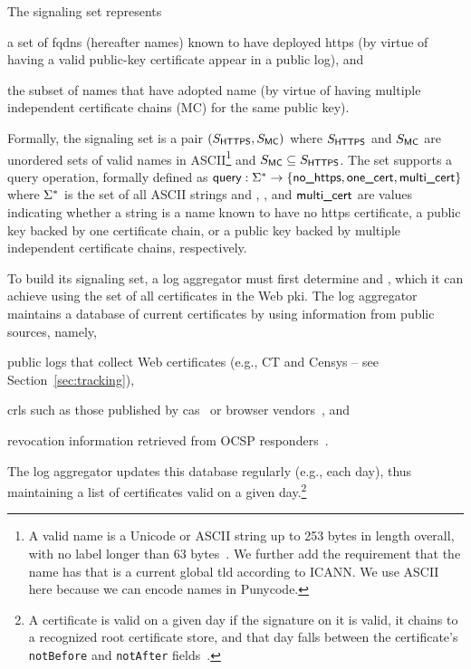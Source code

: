 The signaling set represents
\begin{inparaenum}
\item a set of \acp{fqdn} (hereafter names) known to have deployed \ac{https}
  (by virtue of having a valid public-key certificate appear in a public log), and
\item the subset of names that have adopted \ac{name} (by virtue of having
  multiple independent certificate chains (MC) for the same public key).
\end{inparaenum}
Formally, the signaling set is a pair $(S_{\textsf{HTTPS}}, S_{\textsf{MC}})$ where
$S_{\textsf{HTTPS}}$ and $S_{\textsf{MC}}$ are unordered sets of valid names in
ASCII\footnote{A valid name is a Unicode or ASCII string up to 253 bytes in
  length overall, with no label longer than 63 bytes~\cite{rfc1035}. We further
add the requirement that the name has  that is a current global
\ac{tld} according to ICANN. We use ASCII here because we can encode names in
Punycode.} and $S_{\textsf{MC}} \subseteq S_{\textsf{HTTPS}}$. The set supports a query
operation, formally defined as $\textsf{query}: \Sigma^* \to \{\textsf{no\_https}, \textsf{one\_cert},
\textsf{multi\_cert}\}$ where $\Sigma^*$ is the set of all ASCII strings and \nohttps,
\onecert, and $\textsf{multi\_cert}$ are values indicating whether a string is a name
known to have no \ac{https} certificate, a public key backed by one certificate
chain, or a public key backed by multiple independent certificate chains,
respectively.

To build its signaling set, a log aggregator must first determine \httpsset
and \multicertset, which it can achieve using the set of all certificates in the
Web \ac{pki}. The log aggregator maintains a database of current certificates by
using information from public sources, namely,
\begin{inparaenum}
\item public logs that collect Web certificates 
  (e.g., CT and Censys -- see Section~\ref{sec:tracking}),
\item \acp{crl} such as those published by \acp{ca}~\cite{rfc5280} or browser
  vendors~\cite{langley2012revocation, goodwin2015revoking}, and
\item revocation information retrieved from OCSP responders~\cite{rfc6960}.
\end{inparaenum}
The log aggregator updates this database regularly (e.g., each day), thus
maintaining a list of certificates valid on a given
day.\footnote{\label{note:valid}A certificate
  is valid on a given day if the signature on it is valid, it chains to a
recognized root certificate store, and that day falls between the certificate's
\texttt{notBefore} and \texttt{notAfter} fields~\cite{rfc5280}.}

